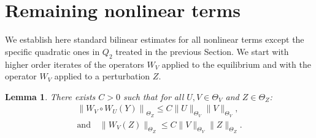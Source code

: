 \documentclass[10pt]{amsart}
\newtheorem{lemm}[theo]{Lemma}\newtheorem{prop}[theo]{Proposition}\newtheorem{coro}[theo]{Corollary}\newtheorem{conj}[theo]{Conjecture}
\theoremstyle{definition}\newtheorem{defi}[theo]{Definition}\newtheorem{rema}[theo]{Remark}\newtheorem{exam}[theo]{Example}\newtheorem{exem}[theo]{Example}\newtheorem{nota}[theo]{Notation}
\begin{document}
\section{Remaining nonlinear terms}\label{sec:remaining}


We establish here standard bilinear estimates for all nonlinear terms except the specific quadratic ones in $Q_2$ treated in the previous Section. We start with higher order iterates of the operators $W_V$ applied to the equilibrium and with the operator $W_V$ applied to a perturbation $Z$.


\begin{lemm}\label{prop:QuadCl2}
There exists $C>0$ such that for all $U,V \in \Theta_V$ and $Z\in \Theta_Z $:
\begin{multline} \label{bd:quadperturbation}
\left\|W_V\circ W_U(Y)\right\|_{\Theta_Z} \leq C \|U\|_{\Theta_V} \|V\|_{\Theta_V}, \\
\text{and} \quad \|W_V(Z)\|_{\Theta_Z} \leq C \|V\|_{\Theta_V} \|Z\|_{\Theta_Z}.
\end{multline}
\end{lemm}
\end{document}
